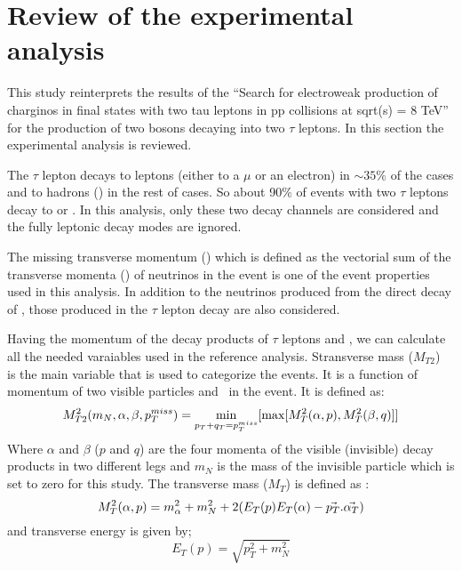 \section{Review of the experimental analysis}


This study reinterprets the results of the ``Search for electroweak production of charginos in final states with two tau leptons in pp collisions at sqrt(s) = 8 TeV''\cite{Khachatryan:2016trj} for the production of two \wprime bosons decaying into two $\tau$ leptons. In this section the experimental analysis is reviewed.

The $\tau$ lepton decays to leptons (either to a $\mu$ or an electron) in $\sim 35\%$ of the cases and to hadrons (\Tau) in the rest of cases. So about 90\% of events with two $\tau$ leptons decay to \lepTau or \tauTau. In this analysis, only these two decay channels are considered and the fully leptonic decay modes are ignored. 

The missing transverse momentum (\MET) which is  defined as the vectorial sum of the transverse momenta (\pt) of neutrinos in the event is one of the event properties used in this analysis. In addition to the neutrinos  produced from the direct decay of \wprime, those produced in the $\tau$ lepton decay are also considered.

Having the momentum of the decay products of $\tau$ leptons and \MET, we can calculate all the needed varaiables used in the reference analysis. Stransverse mass ($M_{T2}$)~\cite{Lester:1999tx,Barr:2003rg}  is the main variable that is used to categorize the events. It is a function of momentum of two visible particles and \MET ~in the event. It is defined as:
\begin{equation}
M^2_{T2}(m_{N},\alpha,\beta,p_T^{miss}) = \displaystyle\min_{p_T+q_T=p_T^{miss}} [\max[M^2_{T}(\alpha,p),M^2_{T}(\beta,q)]]
\end{equation}
Where $\alpha$ and $\beta$ ($p$ and $q$) are the four momenta of the visible (invisible) decay products in two different legs and  $m_N$ is the mass of the invisible particle which is set to zero for this study. The transverse mass ($M_{T}$) is defined as :
\begin{equation}
M^2_{T}(\alpha,p) =  m^2_{\alpha}+m^2_N+2(E_T(p)E_T(\alpha)-\vec{p_T}.\vec{\alpha_T})
\end{equation}
and transverse energy is given by; 
\begin{equation}
E_T(p)=\sqrt{p^2_T+m^2_N}
\end{equation}


